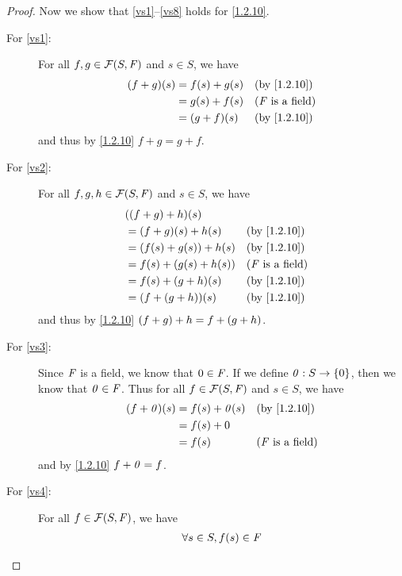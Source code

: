 \begin{proof}
	Now we show that \ref{vs1}--\ref{vs8} holds for \cref{1.2.10}.
	\begin{description}
		\item[For \ref{vs1}:]
			For all \(f, g \in \FS\) and \(s \in S\), we have
			\begin{align*}
				\p{f + g}\p{s} & = f\p{s} + g\p{s} &  & \text{(by \cref{1.2.10})}  \\
				               & = g\p{s} + f\p{s} &  & \text{(\(\F\) is a field)} \\
				               & = \p{g + f}\p{s}  &  & \text{(by \cref{1.2.10})}
			\end{align*}
			and thus by \cref{1.2.10} \(f + g = g + f\).
		\item[For \ref{vs2}:]
			For all \(f, g, h \in \FS\) and \(s \in S\), we have
			\begin{align*}
				 & \p{\p{f + g} + h}\p{s}                                         \\
				 & = \p{f + g}\p{s} + h\p{s}      &  & \text{(by \cref{1.2.10})}  \\
				 & = \p{f\p{s} + g\p{s}} + h\p{s} &  & \text{(by \cref{1.2.10})}  \\
				 & = f\p{s} + \p{g\p{s} + h\p{s}} &  & \text{(\(\F\) is a field)} \\
				 & = f\p{s} + \p{g + h}\p{s}      &  & \text{(by \cref{1.2.10})}  \\
				 & = \p{f + \p{g + h}}\p{s}       &  & \text{(by \cref{1.2.10})}
			\end{align*}
			and thus by \cref{1.2.10} \(\left\lparen f + g\right\rparen + h = f + \left\lparen g + h\right\rparen\).
		\item[For \ref{vs3}:]
			Since \(\mathit{F}\) is a field, we know that \(0 \in \mathit{F}\).
			If we define \(\mathit{0} : S \to \{0\}\), then we know that \(\mathit{0} \in \mathit{F}\).
			Thus for all \(f \in \FS\) and \(s \in S\), we have
			\begin{align*}
				\p{f + \zv}\p{s} & = f\p{s} + \zv\p{s} &  & \text{(by \cref{1.2.10})}  \\
				                 & = f\p{s} + 0                                        \\
				                 & = f\p{s}            &  & \text{(\(\F\) is a field)}
			\end{align*}
			and by \cref{1.2.10} \(f + \mathit{0} = f\).
		\item[For \ref{vs4}:]
			For all \(f \in \FS\), we have
			\begin{align*}
				         & \forall s \in S, f\p{s} \in \F                                                          \\

\end{align*}
\end{description}
\end{proof}

